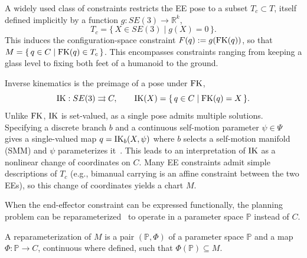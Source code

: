 \documentclass[letterpaper, 10 pt, conference]{ieeeconf}
\begin{document}
A widely used class of constraints restricts the EE pose to a subset $T_c \subset T$, itself defined implicitly by a function $g : SE(3) \to \mathbb{R}^k$,
\begin{equation*}
  T_c = \{\, X \in SE(3) \mid g(X) = 0 \,\}.
\end{equation*}
This induces the configuration-space constraint $F(q) := g(\operatorname{FK}(q))$, so that $M = \{\, q \in C \mid \operatorname{FK}(q) \in T_c \,\}$. This encompasses constraints ranging from keeping a glass level to fixing both feet of a humanoid to the ground.

Inverse kinematics is the preimage of a pose under $\operatorname{FK}$,
\begin{equation*}
  \operatorname{IK} : SE(3) \rightrightarrows C, \qquad
  \operatorname{IK}(X) = \{\, q \in C \mid \operatorname{FK}(q) = X \,\}.
\end{equation*}
Unlike $\operatorname{FK}$, $\operatorname{IK}$ is set-valued, as a single pose admits multiple solutions. Specifying a discrete branch $b$ and a continuous self-motion parameter $\psi \in \Psi$ gives a single-valued map $q = \operatorname{IK}_b(X,\psi)$
where $b$ selects a self-motion manifold (SMM) and $\psi$ parameterizes it~\cite{burdick1989inverse}.
This leads to an interpretation of $\operatorname{IK}$ as a nonlinear change of coordinates on $C$. 
Many EE constraints admit simple descriptions of $T_c$ (e.g., bimanual carrying is an affine constraint between the two EEs), so this change of coordinates yields a chart $M$.

When the end-effector constraint can be expressed functionally, the planning problem can be reparameterized~\cite{cohn2024constrained} to operate in a parameter space $\mathbb{P}$ instead of $C$.

\begin{definition}[Reparameterization]\label{def:reparam}
A reparameterization of $M$ is a pair $(\mathbb{P}, \Phi)$ of a parameter space $\mathbb{P}$ and a map $\Phi : \mathbb{P} \to C$, continuous where defined, such that $\Phi(\mathbb{P}) \subseteq M$.
\end{definition}
\end{document}
